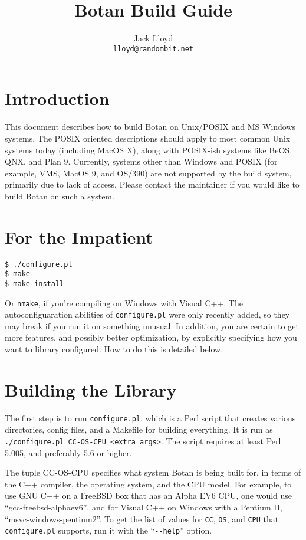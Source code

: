 \documentclass{article}
\title{\textbf{Botan Build Guide}}
\author{Jack Lloyd \\
        \texttt{lloyd@randombit.net}}
\date{}
\newcommand{\filename}[1]{\texttt{#1}}
\begin{document}
\maketitle

\tableofcontents

\parskip=5pt
\pagebreak

\section{Introduction}

This document describes how to build Botan on Unix/POSIX and MS Windows
systems. The POSIX oriented descriptions should apply to most common Unix
systems today (including MacOS X), along with POSIX-ish systems like BeOS, QNX,
and Plan 9.  Currently, systems other than Windows and POSIX (for example, VMS,
MacOS 9, and OS/390) are not supported by the build system, primarily due to
lack of access. Please contact the maintainer if you would like to build Botan
on such a system.

\section{For the Impatient}

\begin{verbatim}
$ ./configure.pl
$ make
$ make install
\end{verbatim}

Or \verb|nmake|, if you're compiling on Windows with Visual C++. The
autoconfiguaration abilities of \filename{configure.pl} were only recently
added, so they may break if you run it on something unusual. In addition, you
are certain to get more features, and possibly better optimization, by
explicitly specifying how you want to library configured. How to do this is
detailed below.

\section{Building the Library}

The first step is to run \filename{configure.pl}, which is a Perl script that
creates various directories, config files, and a Makefile for building
everything. It is run as \verb|./configure.pl CC-OS-CPU <extra args>|. The
script requires at least Perl 5.005, and preferably 5.6 or higher.

The tuple CC-OS-CPU specifies what system Botan is being built for, in terms of
the C++ compiler, the operating system, and the CPU model. For example, to use
GNU C++ on a FreeBSD box that has an Alpha EV6 CPU, one would use
``gcc-freebsd-alphaev6'', and for Visual C++ on Windows with a Pentium II,
``msvc-windows-pentium2''. To get the list of values for \verb|CC|, \verb|OS|,
and \verb|CPU| that \filename{configure.pl} supports, run it with the
``\verb|--help|'' option.
\end{document}
